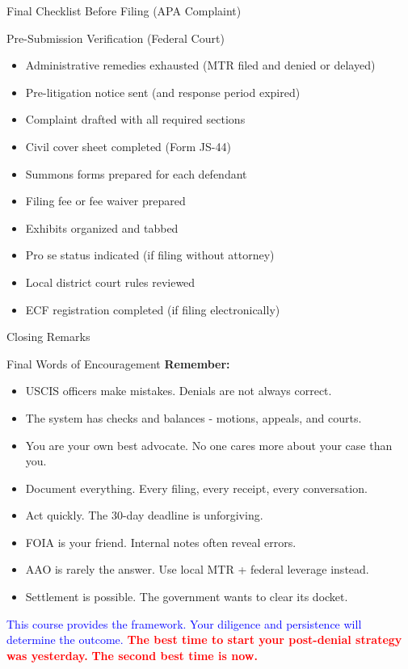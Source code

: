 \documentclass[11pt]{beamer}
\begin{document}
	\begin{frame}{Final Checklist Before Filing (APA Complaint)}
		\scriptsize
		\begin{block}{Pre-Submission Verification (Federal Court)}
			\begin{itemize}
				\item [$\square$] Administrative remedies exhausted (MTR filed and denied or delayed)
				\item [$\square$] Pre-litigation notice sent (and response period expired)
				\item [$\square$] Complaint drafted with all required sections
				\item [$\square$] Civil cover sheet completed (Form JS-44)
				\item [$\square$] Summons forms prepared for each defendant
				\item [$\square$] Filing fee or fee waiver prepared
				\item [$\square$] Exhibits organized and tabbed
				\item [$\square$] Pro se status indicated (if filing without attorney)
				\item [$\square$] Local district court rules reviewed
				\item [$\square$] ECF registration completed (if filing electronically)
			\end{itemize}
		\end{block}
	\end{frame}
	
	\begin{frame}{Closing Remarks}
		\scriptsize
		\begin{block}{Final Words of Encouragement}
			\textbf{Remember:}
			\begin{itemize}
				\item USCIS officers make mistakes. Denials are not always correct.
				\item The system has checks and balances - motions, appeals, and courts.
				\item You are your own best advocate. No one cares more about your case than you.
				\item Document everything. Every filing, every receipt, every conversation.
				\item Act quickly. The 30-day deadline is unforgiving.
				\item FOIA is your friend. Internal notes often reveal errors.
				\item AAO is rarely the answer. Use local MTR + federal leverage instead.
				\item Settlement is possible. The government wants to clear its docket.
			\end{itemize}
			\vspace{0.3cm}
			\textcolor{blue}{This course provides the framework. Your diligence and persistence will determine the outcome.}
			\vspace{0.3cm}
			\textcolor{red}{\textbf{The best time to start your post-denial strategy was yesterday.}}
			\textcolor{red}{\textbf{The second best time is now.}}
		\end{block}
	\end{frame}
	
\end{document}
